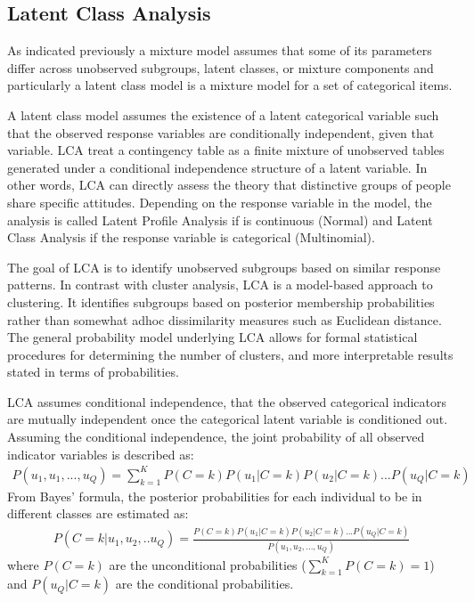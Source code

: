\documentclass[12pt,a4paper,oneside]{reedthesis}
\begin{document}
\hypertarget{latent-class-analysis}{%
\subsection{Latent Class Analysis}\label{latent-class-analysis}}

As indicated previously a mixture model assumes that some of its parameters differ across unobserved subgroups, latent classes, or mixture components and particularly a latent class model is a mixture model for a set of categorical items.

A latent class model assumes the existence of a latent categorical variable such that the observed response variables are conditionally independent, given that variable. LCA treat a contingency table as a finite mixture of unobserved tables generated under a conditional independence structure of a latent variable. In other words, LCA can directly assess the theory that distinctive groups of people share specific attitudes. Depending on the response variable in the model, the analysis is called Latent Profile Analysis if is continuous (Normal) and Latent Class Analysis if the response variable is categorical (Multinomial).

The goal of LCA is to identify unobserved subgroups based on similar response patterns. In contrast with cluster analysis, LCA is a model-based approach to clustering. It identifies subgroups based on posterior membership probabilities rather than somewhat adhoc dissimilarity measures such as Euclidean distance. The general probability model underlying LCA allows for formal statistical procedures for determining the number of clusters, and more interpretable results stated in terms of probabilities.

LCA assumes conditional independence, that the observed categorical indicators are mutually independent once the categorical latent variable is conditioned out. Assuming the conditional independence, the joint probability of all observed indicator variables is described as:
\begin{align}
P(u_1,u_1,...,u_Q)= \sum_{k=1}^K{P(C=k)P(u_1|C=k)P(u_2|C=k)...P(u_Q|C=k)}
\end{align}
From Bayes' formula, the posterior probabilities for each individual to be in different classes are estimated as:
\begin{align}
P(C=k|u_1,u_2,..u_Q)=\frac{P(C=k)P(u_1|C=k)P(u_2|C=k)...P(u_Q|C=k)}{P(u_1,u_2,...,u_Q)}
\end{align}
where \(P(C=k)\) are the unconditional probabilities (\(\sum_{k=1}^KP(C=k)=1\)) and \(P(u_Q|C=k)\) are the conditional probabilities.
\end{document}
